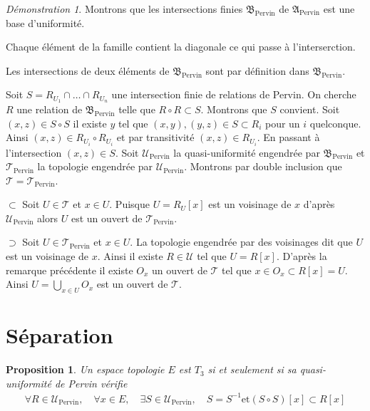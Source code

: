 \documentclass[a4paper, 11pt, french]{book}
\newenvironment{itemise}{\itemize}{\enditemize}
\theoremstyle{plain} %
\newtheorem{proposition}{Proposition}
\theoremstyle{definition} %
\theoremstyle{remark} %
\newtheorem*{demonstration}{Démonstration}
\newcommand{\1}{\mathds{1}}
\newcommand{\inv}[1]{#1^{-1}}
\newcommand{\et}{\mathrel{\mathrm{et}}}
\renewcommand{\frak}[1]{\mathfrak{#1}}
\newcommand{\scr}[1]{\mathscr{#1}}
\renewcommand{\rm}[1]{\mathrm{#1}}
\begin{document}
\begin{demonstration}
	Montrons que les intersections finies $\frak{B}_\rm{Pervin}$ de $\frak{A}_\rm{Pervin}$ est une base d'uniformité.
	\begin{itemise}
		\item Chaque élément de la famille contient la diagonale ce qui passe à l'interserction.
		\item Les intersections de deux éléments de $\frak{B}_\rm{Pervin}$ sont par définition dans $\frak{B}_\rm{Pervin}$.
		\item Soit $S=R_{U_1}\cap\dots\cap R_{U_n}$ une intersection finie de relations de Pervin.
		On cherche $R$ une relation de $\frak{B}_\rm{Pervin}$ telle que $R\circ R\subset S$.
		Montrons que $S$ convient.
		Soit $(x, z)\in S\circ S$ il existe $y$ tel que $(x, y), (y, z)\in S\subset R_i$ pour un $i$ quelconque.
		Ainsi $(x, z)\in R_{U_i}\circ R_{U_i}$ et par transitivité $(x, z)\in R_{U_i}$.
		En passant à l'intersection $(x, z)\in S$.
	\end{itemise}
	Soit $\scr{U}_\rm{Pervin}$ la quasi-uniformité engendrée par $\frak{B}_\rm{Pervin}$ et $\scr{T}_\rm{Pervin}$ la topologie engendrée par $\scr{U}_\rm{Pervin}$.
	Montrons par double inclusion que $\scr{T}=\scr{T}_\rm{Pervin}$.
	\begin{itemise}
		\item[$\subset$] Soit $U\in\scr{T}$ et $x\in U$.
		Puisque $U=R_U[x]$ est un voisinage de $x$ d'après $\scr{U}_\rm{Pervin}$ alors $U$ est un ouvert de $\scr{T}_\rm{Pervin}$.
		\item[$\supset$] Soit $U\in\scr{T}_\rm{Pervin}$ et $x\in U$.
		La topologie engendrée par des voisinages dit que $U$ est un voisinage de $x$.
		Ainsi il existe $R\in\scr{U}$ tel que $U=R[x]$.
		D'après la remarque précédente il existe $O_x$ un ouvert de $\scr{T}$ tel que $x\in O_x\subset R[x]=U$.
		Ainsi $U=\bigcup_{x\in U}O_x$ est un ouvert de $\scr{T}$.
	\end{itemise}
\end{demonstration}

\section{Séparation}

\begin{proposition}
	Un espace topologie $E$ est $T_3$ si et seulement si sa quasi-uniformité de Pervin vérifie
	\begin{align*}
		\forall R\in\scr{U}_\rm{Pervin},\quad \forall x\in E,\quad \exists S\in\scr{U}_\rm{Pervin},\quad S=\inv{S}\et (S\circ S)[x]\subset R[x]
	\end{align*}
\end{proposition}
\end{document}
